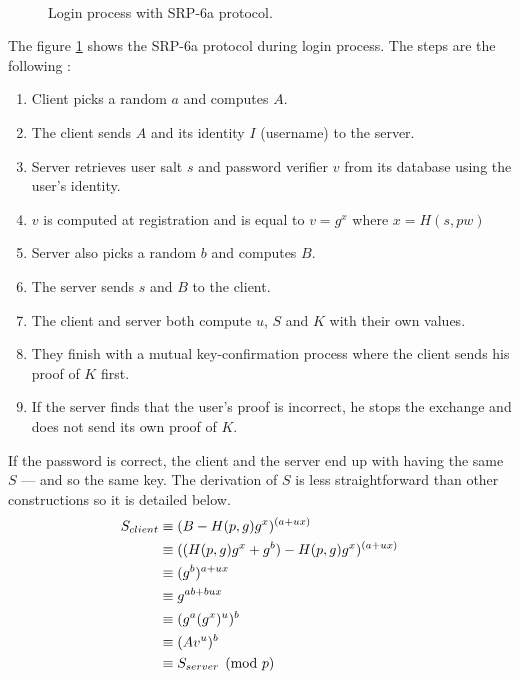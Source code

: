 ﻿\documentclass[../report.tex]{subfiles}
\begin{document}
\paragraph{}
\begin{figure}[h]
 \centering
 \setlength{\fboxsep}{10pt}
 \setlength{\fboxrule}{1pt}
 \caption{Login process with SRP-6a protocol.}
 \label{fig:SRP}
\end{figure}
The figure \ref{fig:SRP} shows the SRP-6a protocol during login process.
The steps are the following :
\begin{enumerate}
 \item Client picks a random $a$ and computes $A$.
 \item The client sends $A$ and its identity $I$ (username) to the server.
 \item Server retrieves user salt $s$ and password verifier $v$ from its database using the user's identity.
 \item $v$ is computed at registration and is equal to $v = g^x$ where $x = H(s, pw)$
 \item Server also picks a random $b$ and computes $B$.
 \item The server sends $s$ and $B$ to the client.
 \item The client and server both compute $u$, $S$ and $K$ with their own values.
 \item They finish with a mutual key-confirmation process where the client sends his proof of $K$ first.
 \item If the server finds that the user's proof is incorrect, he stops the exchange and does not send its own proof of $K$.
\end{enumerate}
If the password is correct, the client and the server end up with having the same $S$ --- and so the same key. The derivation of $S$ is less straightforward than other constructions so it is detailed below.
\begin{align*}
 S_{client}
 &\equiv (B - H(p, g) g^x)^{(a+ux)}\notag\\
 &\equiv ((H(p, g) g^x + g^b) - H(p, g) g^x)^{(a+ux)}\notag\\
 &\equiv (g^b)^{a+ux}\notag\\
 &\equiv g^{ab+bux}\notag\\
 &\equiv (g^a (g^x)^u)^b\notag\\
 &\equiv (Av^u)^b\notag\\
 &\equiv S_{server} \pmod{p}
\end{align*}
\end{document}
